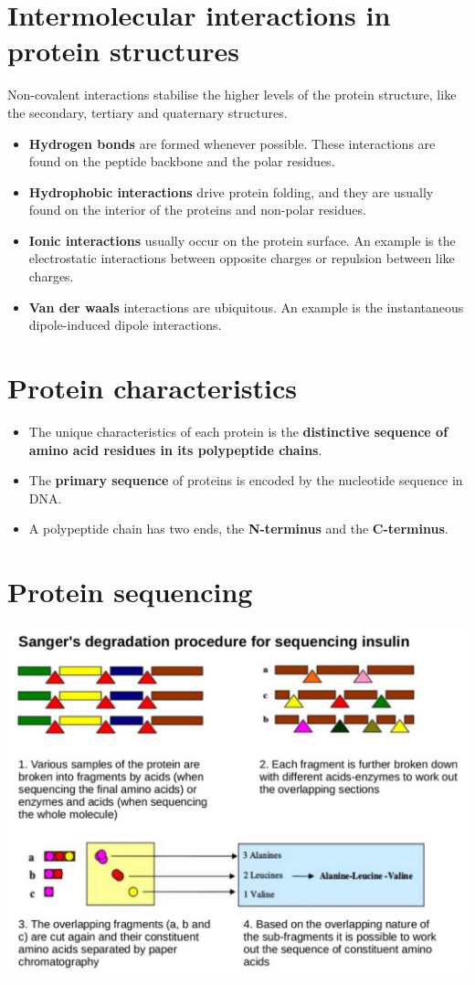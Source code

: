 \documentclass[11pt]{article}
\begin{document}
\section{Intermolecular interactions in protein structures}
\label{sec:org98b4b8f}
Non-covalent interactions stabilise the higher levels of the protein structure, like the secondary, tertiary and quaternary structures.

\begin{itemize}
\item \textbf{Hydrogen bonds} are formed whenever possible. These interactions are found on the peptide backbone and the polar residues.
\item \textbf{Hydrophobic interactions} drive protein folding, and they are usually found on the interior of the proteins and non-polar residues.
\item \textbf{Ionic interactions} usually occur on the protein surface. An example is the electrostatic interactions between opposite charges or repulsion between like charges.
\item \textbf{Van der waals} interactions are ubiquitous. An example is the instantaneous dipole-induced dipole interactions.
\end{itemize}
\section{Protein characteristics}
\label{sec:org37ff4d4}
\begin{itemize}
\item The unique characteristics of each protein is the \textbf{distinctive sequence of amino acid residues in its polypeptide chains}.
\item The \textbf{primary sequence} of proteins is encoded by the nucleotide sequence in DNA.
\item A polypeptide chain has two ends, the \textbf{N-terminus} and the \textbf{C-terminus}.
\end{itemize}
\section{Protein sequencing}
\label{sec:org3bb0ac5}

\begin{center}
\includegraphics[width=.9\linewidth]{./images/protein-sequencing.png}
\end{center}
\end{document}

